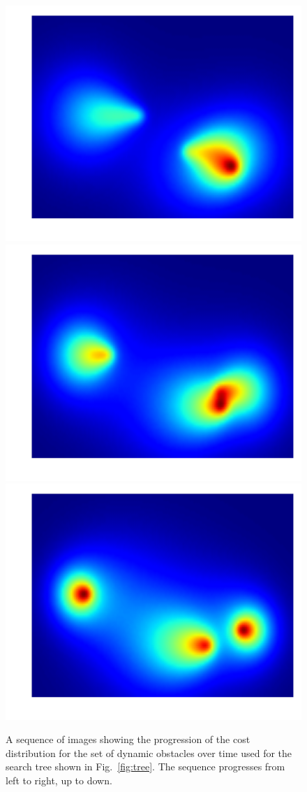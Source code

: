 \begin{figure}[h!]
    \includegraphics[width=0.32\linewidth]{figs/ex_agent_6}
    \includegraphics[width=0.32\linewidth]{figs/ex_agent_7}
    \includegraphics[width=0.32\linewidth]{figs/ex_agent_8}

    \caption{A sequence of images showing the progression of the cost
    distribution for the set of dynamic obstacles over time used for the search
tree shown in Fig.~\ref{fig:tree}. The sequence progresses from left to right,
up to down.}

    \label{fig:ex_agents}
\end{figure}



